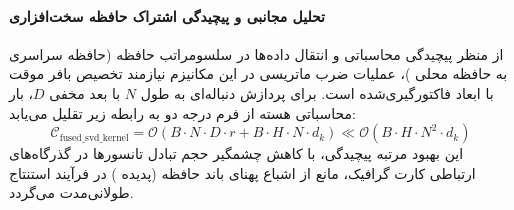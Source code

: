 \paragraph{تحلیل مجانبی و پیچیدگی اشتراک حافظه سخت‌افزاری}
از منظر پیچیدگی محاسباتی و انتقال داده‌ها در سلسومراتب حافظه (حافظه سراسری  به حافظه محلی )، عملیات ضرب ماتریسی در این مکانیزم نیازمند تخصیص بافر موقت با ابعاد فاکتورگیری‌شده است. برای پردازش دنباله‌ای به طول $N$ با بعد مخفی $D$، بار محاسباتی هسته از فرم درجه دو به رابطه زیر تقلیل می‌یابد:
\begin{equation}
\label{eq:complexity_fused_svd_kernel}
\mathcal{C}_{\text{fused\_svd\_kernel}} = \mathcal{O}\left( B \cdot N \cdot D \cdot r + B \cdot H \cdot N \cdot d_k \right) \ll \mathcal{O}\left( B \cdot H \cdot N^2 \cdot d_k \right)
\end{equation}
این بهبود مرتبه پیچیدگی، با کاهش چشمگیر حجم تبادل تانسورها در گذرگاه‌های ارتباطی کارت گرافیک، مانع از اشباع پهنای باند حافظه (پدیده ) در فرآیند استنتاج طولانی‌مدت می‌گردد.
